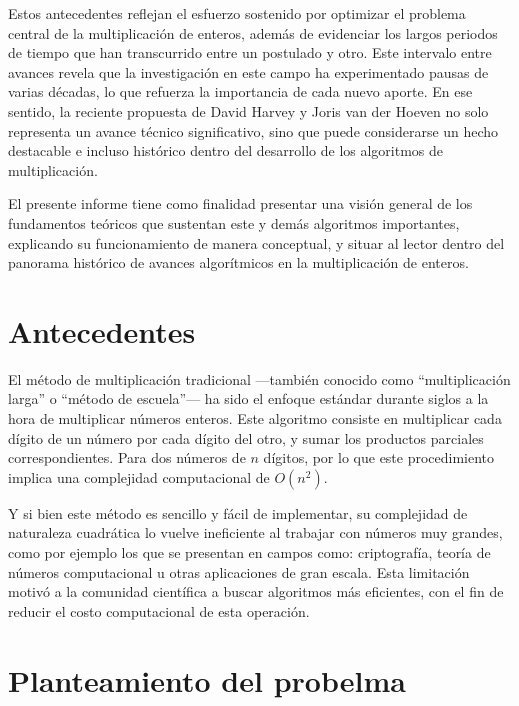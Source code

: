 Estos antecedentes reflejan el esfuerzo sostenido por optimizar el problema central de la multiplicación de enteros, además de evidenciar los largos periodos de tiempo que han transcurrido entre un postulado y otro. Este intervalo entre avances revela que la investigación en este campo ha experimentado pausas de varias décadas, lo que refuerza la importancia de cada nuevo aporte. En ese sentido, la reciente propuesta de David Harvey y Joris van der Hoeven no solo representa un avance técnico significativo, sino que puede considerarse un hecho destacable e incluso histórico dentro del desarrollo de los algoritmos de multiplicación.

El presente informe tiene como finalidad presentar una visión general de los fundamentos teóricos que sustentan este y demás algoritmos importantes, explicando su funcionamiento de manera conceptual, y situar al lector dentro del panorama histórico de avances algorítmicos en la multiplicación de enteros.    

\section{Antecedentes}
\label{sec:into_back}

El método de multiplicación tradicional —también conocido como ``multiplicación larga'' o ``método de escuela''— ha sido el enfoque estándar durante siglos a la hora de multiplicar números enteros. Este algoritmo consiste en multiplicar cada dígito de un número por cada dígito del otro, y sumar los productos parciales correspondientes. Para dos números de \( n \) dígitos, por lo que este procedimiento implica una complejidad computacional de \( O(n^2) \). 

Y si bien este método es sencillo y fácil de implementar, su complejidad de naturaleza cuadrática lo vuelve ineficiente al trabajar con números muy grandes, como por ejemplo los que se presentan en campos como: criptografía, teoría de números computacional u otras aplicaciones de gran escala. 
Esta limitación motivó a la comunidad científica a buscar algoritmos más eficientes, con el fin de reducir el costo computacional de esta operación.

\section{Planteamiento del probelma}
\label{sec:intro_prob_art}

